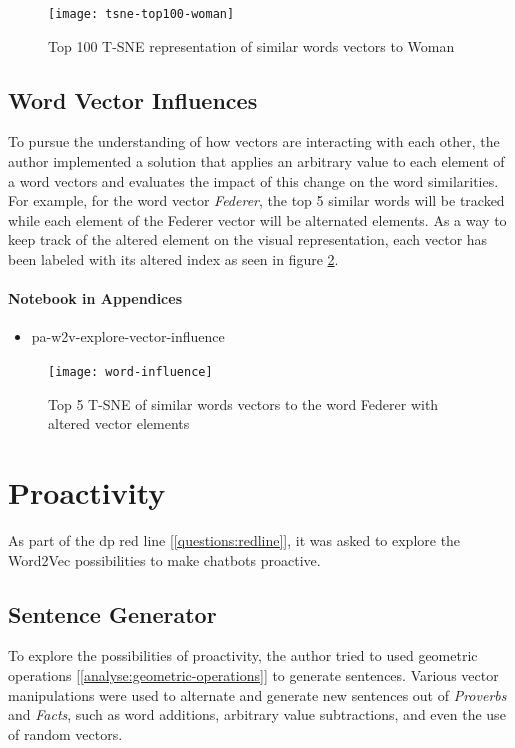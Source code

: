 \begin{figure}[h!]
    \centering
    \texttt{[image: tsne-top100-woman]}
    \caption{Top 100 T-SNE representation of similar words vectors to Woman}
    \label{fig:tsne-top100-woman}
\end{figure}


\subsection{Word Vector Influences}
To pursue the understanding of how vectors are interacting with each other, the author implemented a solution that applies an arbitrary value to each element of a word vectors and evaluates the impact of this change on the word similarities. For example, for the word vector \textit{Federer}, the top 5 similar words will be tracked while each element of the Federer vector will be alternated elements. As a way to keep track of the altered element on the visual representation, each vector has been labeled with its altered index as seen in figure \ref{fig:word-influence}. 

\paragraph{Notebook in Appendices}
\begin{itemize}
    \setlength\itemsep{0em}
    \item pa-w2v-explore-vector-influence
\end{itemize}

\begin{figure}[h!]
    \centering
    \texttt{[image: word-influence]}
    \caption{Top 5 T-SNE of similar words vectors to the word Federer with altered vector elements}
    \label{fig:word-influence}
\end{figure}


\section{Proactivity}
As part of the \gls{dp} red line [\ref{questions:redline}], it was asked to explore the Word2Vec possibilities to make chatbots proactive.

\subsection{Sentence Generator}
To explore the possibilities of proactivity, the author tried to used geometric operations [\ref{analyse:geometric-operations}] to generate sentences. Various vector manipulations were used to alternate and generate new sentences out of \textit{Proverbs} and \textit{Facts}, such as word additions, arbitrary value subtractions, and even the use of random vectors. \\

